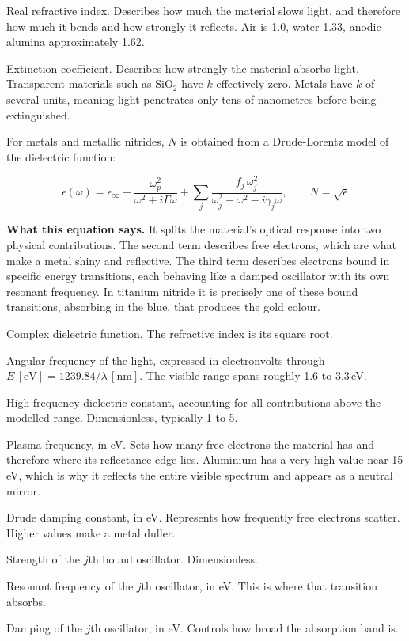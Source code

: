 \documentclass[11pt,a4paper]{article}
\newenvironment{symlist}
  {\vspace{-0.2em}\begin{list}{}{%
    \setlength{\leftmargin}{2.4em}\setlength{\labelwidth}{2.0em}%
    \setlength{\labelsep}{0.4em}\setlength{\itemsep}{1pt}%
    \setlength{\parsep}{0pt}\setlength{\topsep}{3pt}%
    \renewcommand{\makelabel}[1]{##1\hfil}}}
  {\end{list}}
\begin{document}
\begin{symlist}
\item[$n$] Real refractive index. Describes how much the material slows light,
and therefore how much it bends and how strongly it reflects. Air is 1.0, water
1.33, anodic alumina approximately 1.62.
\item[$k$] Extinction coefficient. Describes how strongly the material absorbs
light. Transparent materials such as $\mathrm{SiO_2}$ have $k$ effectively
zero. Metals have $k$ of several units, meaning light penetrates only tens of
nanometres before being extinguished.
\end{symlist}

For metals and metallic nitrides, $N$ is obtained from a Drude-Lorentz model of
the dielectric function:

\begin{equation}
\epsilon(\omega) = \epsilon_\infty
- \frac{\omega_p^2}{\omega^2 + i\Gamma\omega}
+ \sum_j \frac{f_j\,\omega_j^2}{\omega_j^2 - \omega^2 - i\gamma_j\omega},
\qquad N = \sqrt{\epsilon}
\label{eq:drude}
\end{equation}

\noindent\textbf{What this equation says.} It splits the material's optical
response into two physical contributions. The second term describes free
electrons, which are what make a metal shiny and reflective. The third term
describes electrons bound in specific energy transitions, each behaving like a
damped oscillator with its own resonant frequency. In titanium nitride it is
precisely one of these bound transitions, absorbing in the blue, that produces
the gold colour.

\begin{symlist}
\item[$\epsilon$] Complex dielectric function. The refractive index is its
square root.
\item[$\omega$] Angular frequency of the light, expressed in electronvolts
through $E\,[\mathrm{eV}] = 1239.84 / \lambda\,[\mathrm{nm}]$. The visible range
spans roughly 1.6 to 3.3\,eV.
\item[$\epsilon_\infty$] High frequency dielectric constant, accounting for all
contributions above the modelled range. Dimensionless, typically 1 to 5.
\item[$\omega_p$] Plasma frequency, in eV. Sets how many free electrons the
material has and therefore where its reflectance edge lies. Aluminium has a
very high value near 15\,eV, which is why it reflects the entire visible
spectrum and appears as a neutral mirror.
\item[$\Gamma$] Drude damping constant, in eV. Represents how frequently free
electrons scatter. Higher values make a metal duller.
\item[$f_j$] Strength of the $j$th bound oscillator. Dimensionless.
\item[$\omega_j$] Resonant frequency of the $j$th oscillator, in eV. This is
where that transition absorbs.
\item[$\gamma_j$] Damping of the $j$th oscillator, in eV. Controls how broad
the absorption band is.
\end{symlist}
\end{document}
